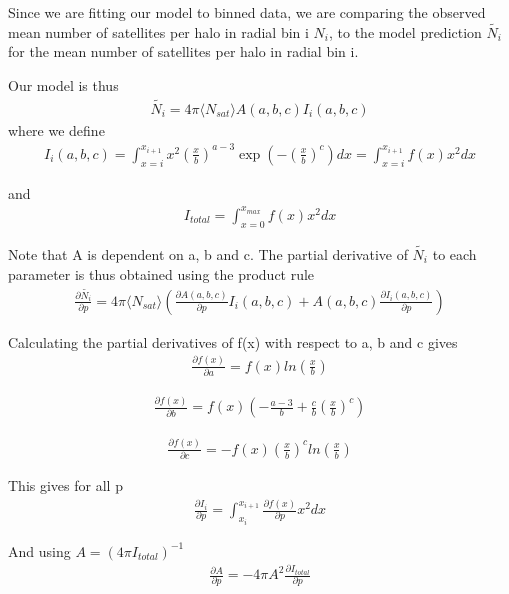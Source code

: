 \documentclass{article}
\begin{document}
Since we are fitting our model to binned data, we are comparing the observed mean number of satellites per halo in radial bin i $N_i$, to the
model prediction $\tilde{N_i}$ for the mean number of satellites per halo in radial bin i.

Our model is thus
\begin{align}
  \tilde{N_i} = 4 \pi \langle N_{sat} \rangle A(a,b,c) I_i(a,b,c)
\end{align}
where we define
\begin{align}
  I_i(a,b,c) = \int_{x=i}^{x_{i+1}} x^2 \left(\frac{x}{b}\right)^{a-3} \exp(-\left(\frac{x}{b}\right)^c) dx = \int_{x=i}^{x_{i+1}} f(x) x^2 dx
\end{align}

and
\begin{align}
  I_{total} = \int_{x=0}^{x_{max}} f(x) x^2 dx
\end{align}

Note that A is dependent on a, b and c. The partial derivative of $\tilde{N_i}$ to each parameter is thus obtained using the product rule
\begin{align}
  \frac{\partial \tilde{N_i}}{\partial p} = 4 \pi \langle N_{sat} \rangle \left(\frac{\partial A(a,b,c)}{\partial p} I_i(a,b,c) + A(a,b,c) \frac{\partial I_i(a,b,c)}{\partial p}\right)
\end{align}

Calculating the partial derivatives of f(x) with respect to a, b and c gives
\begin{align}
  \frac{\partial f(x)}{\partial a} = f(x) ln \left(\frac{x}{b}\right)
\end{align}

\begin{align}
  \frac{\partial f(x)}{\partial b} = f(x) \left(-\frac{a-3}{b} + \frac{c}{b}\left(\frac{x}{b}\right)^c\right)
\end{align}

\begin{align}
  \frac{\partial f(x)}{\partial c} = - f(x) \left(\frac{x}{b}\right)^c ln \left(\frac{x}{b}\right)
\end{align}

This gives for all p
\begin{align}
  \frac{\partial I_i}{\partial p} = \int_{x_i}^{x_{i+1}} \frac{\partial f(x)}{\partial p} x^2 dx
\end{align}

And using $ A = (4 \pi I_{total})^{-1}$
\begin{align}
  \frac{\partial A}{\partial p} = - 4 \pi A^2 \frac{\partial I_{total}}{\partial p}
\end{align}
\end{document}

